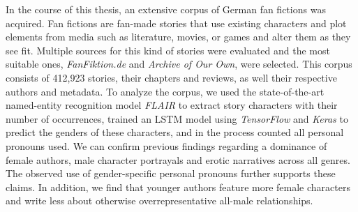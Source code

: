
In the course of this thesis, an extensive corpus of German fan fictions was acquired.
Fan fictions are fan-made stories that use existing characters and plot elements from media such as literature, movies, or games and alter them as they see fit.
Multiple sources for this kind of stories were evaluated and the most suitable ones, \emph{FanFiktion.de} and \emph{Archive of Our Own}, were selected.
This corpus consists of 412,923 stories, their chapters and reviews, as well their respective authors and metadata.
To analyze the corpus, we used the state-of-the-art named-entity recognition model \emph{FLAIR} to extract story characters with their number of occurrences, trained an LSTM model using \emph{TensorFlow} and \emph{Keras} to predict the genders of these characters, and in the process counted all personal pronouns used.
We can confirm previous findings regarding a dominance of female authors, male character portrayals and erotic narratives across all genres.
The observed use of gender-specific personal pronouns further supports these claims.
In addition, we find that younger authors feature more female characters and write less about otherwise overrepresentative all-male relationships.
